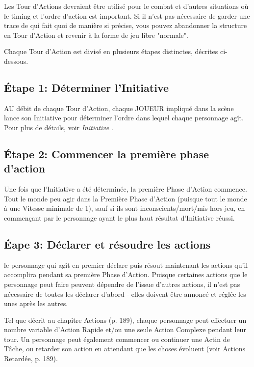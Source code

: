Les Tour d'Actions devraient être utilisé pour le combat et d'autres situations où le timing et l'ordre d'action est important. Si il n'est pas nécessaire de garder une trace de qui fait quoi de manière si précise, vous pouvez abandonner la structure en Tour d'Action et revenir à la forme de jeu libre "normale". 

Chaque Tour d'Action est divisé en plusieurs étapes distinctes, décrites ci-dessous. 



\subsection{Étape 1: Déterminer l'Initiative} \label{sec:roll-initiative} 

AU débit de chaque Tour d'Action, chaque JOUEUR impliqué dans la scène lance son Initiative pour déterminer l'ordre dans lequel chaque personnage agît. Pour plus de détails, voir \emph{ Initiative }. 



\subsection{Étape 2: Commencer la première phase d'action} \label{sec:begin-first-phase} 

Une fois que l'Initiative a été déterminée, la première Phase d'Action commence. Tout le monde peu agir dans la Première Phase d'Action (puisque tout le monde à une Vitesse minimale de 1), sauf si ils sont inconscients/mort/mis hors-jeu, en commençant par le personnage ayant le plus haut résultat d'Initiative réussi. 



\subsection{Éape 3: Déclarer et résoudre les actions} \label{sec:declare-resolve} 

le personnage qui agît en premier déclare puis résout maintenant les actions qu'il accomplira pendant sa première Phase d'Action. Puisque certaines actions que le personnage peut faire peuvent dépendre de l'issue d'autres actions, il n'est pas nécessaire de toutes les déclarer d'abord - elles doivent être annoncé et réglée les unes après les autres. 

Tel que décrit au chapitre Actions (p. 189), chaque personnage peut effectuer un nombre variable d'Action Rapide et/ou une seule Action Complexe pendant leur tour. Un personnage peut également commencer ou continuer une Actin de Tâche, ou retarder son action en attendant que les choses évoluent (voir Actions Retardée, p. 189). 


